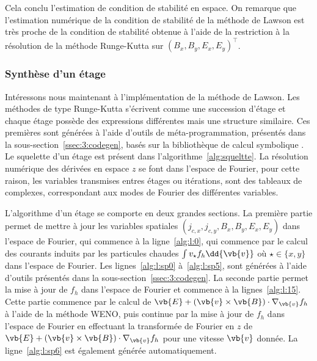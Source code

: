 Cela conclu l'estimation de condition de stabilité en espace. On remarque que l'estimation numérique de la condition de stabilité de la méthode de Lawson est très proche de la condition de stabilité obtenue à l'aide de la restriction à la résolution de la méthode Runge-Kutta sur $(B_x,B_y,E_x,E_y)^\top$.


\subsubsection{Synthèse d'un étage}
\label{ssec:3:stage}

Intéressons nous maintenant à l'implémentation de la méthode de Lawson. Les méthodes de type Runge-Kutta s'écrivent comme une succession d'étage et chaque étage possède des expressions différentes mais une structure similaire. Ces premières sont générées à l'aide d'outils de méta-programmation, présentés dans la sous-section~\ref{ssec:3:codegen}, basés sur la bibliothèque \Python{} de calcul symbolique \sympy{}. Le squelette d'un étage est présent dans l'algorithme~\ref{alg:squeltte}. La résolution numérique des dérivées en espace $z$ se font dans l'espace de Fourier, pour cette raison, les variables transmises entres étages ou itérations, sont des tableaux de complexes, correspondant aux modes de Fourier des différentes variables.

L'algorithme d'un étage se comporte en deux grandes sections. La première partie permet de mettre à jour les variables spatiales $(j_{c,x},j_{c,y},B_x,B_y,E_x,E_y)$ dans l'espace de Fourier, qui commence à la ligne~\ref{alg:l:0}, qui commence par le calcul des courants induits par les particules chaudes $\int v_\star f_h\dd{\vb{v}}$ où $\star\in\{x,y\}$ dans l'espace de Fourier. Les lignes~\ref{alg:l:sp0} à~\ref{alg:l:sp5}, sont générées à l'aide d'outils présentés dans la sous-section~\ref{ssec:3:codegen}. La seconde partie permet la mise à jour de $f_h$ dans l'espace de Fourier et commence à la lignes~\ref{alg:l:15}. Cette partie commence par le calcul de $\vb{E}+(\vb{v}\times\vb{B})\cdot\nabla_{\vb{v}}f_h$ à l'aide de la méthode WENO, puis continue par la mise à jour de $f_h$ dans l'espace de Fourier en effectuant la transformée de Fourier en $z$ de $\vb{E}+(\vb{v}\times\vb{B})\cdot\nabla_{\vb{v}}f_h$ pour une vitesse $\vb{v}$ donnée. La ligne~\ref{alg:l:sp6} est également générée automatiquement.


